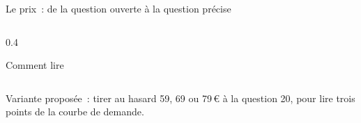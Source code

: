 \begin{frame}{Le prix~: de la question ouverte à la question précise}
\begin{columns}[T]
\begin{column}{0.4\textwidth}
\begin{encadre}{Comment lire}
      \end{encadre}
    \end{column}
  \end{columns}
  \vspace{0.05cm}
  \begin{pcompact}\centering\footnotesize
    Variante proposée~: tirer au hasard 59, 69 ou 79\,€ à la question 20, pour lire trois points de la courbe de demande.
  \end{pcompact}
\end{frame}

